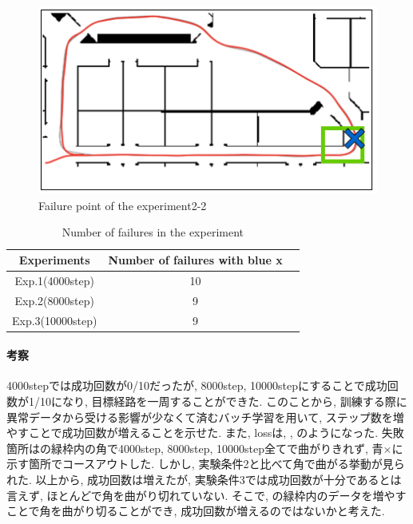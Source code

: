 \begin{figure}[h]
  \centering
  \includegraphics[keepaspectratio, scale=0.6]{images/result3.png}
  \caption{Failure point of the experiment2-2}
  \label{Fig:result3}
  \end{figure}

\begin{table}[h]
  \centering
  \begin{tabular}{|c|c|c|} \hline
    Experiments & Number of failures with blue x \\ \hline
    Exp.1(4000step) & 10 \\ \hline
    Exp.2(8000step) & 9 \\ \hline
    Exp.3(10000step) & 9 \\ \hline
  \end{tabular}
  \caption{Number of failures in the experiment}
  \label{tb:fail3}
\end{table}

\paragraph{考察}
4000stepでは成功回数が0/10だったが, 8000step, 10000stepにすることで成功回数が1/10になり, 目標経路を一周することができた. このことから, 訓練する際に異常データから受ける影響が少なくて済むバッチ学習を用いて, ステップ数を増やすことで成功回数が増えることを示せた. また, lossは, , のようになった. 失敗箇所はの緑枠内の角で4000step, 8000step, 10000step全てで曲がりきれず, 青×に示す箇所でコースアウトした. しかし, 実験条件2と比べて角で曲がる挙動が見られた. 以上から, 成功回数は増えたが, 実験条件3では成功回数が十分であるとは言えず, ほとんどで角を曲がり切れていない. そこで, の緑枠内のデータを増やすことで角を曲がり切ることができ, 成功回数が増えるのではないかと考えた. 

